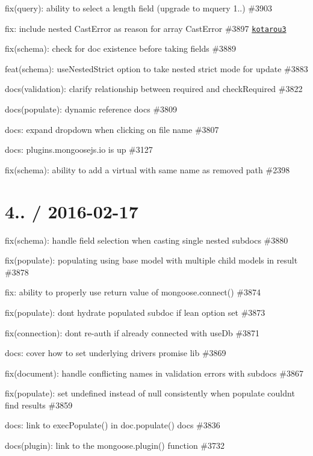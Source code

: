 \begin{DoxyItemize}
\item fix(query)\+: ability to select a length field (upgrade to mquery 1..) \#3903
\item fix\+: include nested Cast\+Error as reason for array Cast\+Error \#3897 \href{https://github.com/kotarou3}{\tt kotarou3}
\item fix(schema)\+: check for doc existence before taking fields \#3889
\item feat(schema)\+: use\+Nested\+Strict option to take nested strict mode for update \#3883
\item docs(validation)\+: clarify relationship between required and check\+Required \#3822
\item docs(populate)\+: dynamic reference docs \#3809
\item docs\+: expand dropdown when clicking on file name \#3807
\item docs\+: plugins.\+mongoosejs.\+io is up \#3127
\item fix(schema)\+: ability to add a virtual with same name as removed path \#2398
\end{DoxyItemize}

\section*{4.. / 2016-\/02-\/17 }


\begin{DoxyItemize}
\item fix(schema)\+: handle field selection when casting single nested subdocs \#3880
\item fix(populate)\+: populating using base model with multiple child models in result \#3878
\item fix\+: ability to properly use return value of {\ttfamily mongoose.\+connect()} \#3874
\item fix(populate)\+: dont hydrate populated subdoc if lean option set \#3873
\item fix(connection)\+: dont re-\/auth if already connected with use\+Db \#3871
\item docs\+: cover how to set underlying driver\textquotesingle{}s promise lib \#3869
\item fix(document)\+: handle conflicting names in validation errors with subdocs \#3867
\item fix(populate)\+: set undefined instead of null consistently when populate couldn\textquotesingle{}t find results \#3859
\item docs\+: link to {\ttfamily exec\+Populate()} in {\ttfamily doc.\+populate()} docs \#3836
\item docs(plugin)\+: link to the {\ttfamily mongoose.\+plugin()} function \#3732
\end{DoxyItemize}

